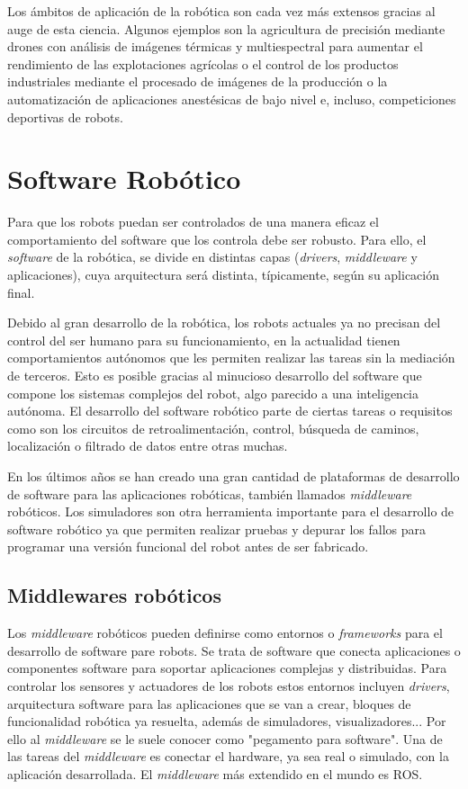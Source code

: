 Los ámbitos de aplicación de la robótica son cada vez más extensos gracias al auge de esta ciencia. Algunos ejemplos son la agricultura de precisión mediante drones con análisis de imágenes térmicas y multiespectral para aumentar el rendimiento de las explotaciones agrícolas o el control de los productos industriales mediante el procesado de imágenes de la producción o la automatización de aplicaciones anestésicas de bajo nivel e, incluso, competiciones deportivas de robots.

\section{Software Robótico}
Para que los robots puedan ser controlados de una manera eficaz el comportamiento del software que los controla debe ser robusto. Para ello, el \textit{software} de la robótica, se divide en distintas capas (\textit{drivers}, \textit{middleware} y aplicaciones), cuya arquitectura será distinta, típicamente, según su aplicación final.

Debido al gran desarrollo de la robótica, los robots actuales ya no precisan del control del ser humano para su funcionamiento, en la actualidad tienen comportamientos autónomos que les permiten realizar las tareas sin la mediación de terceros. Esto es posible gracias al minucioso desarrollo del software que compone los sistemas complejos del robot, algo parecido a una inteligencia autónoma. El desarrollo del software robótico parte de ciertas tareas o requisitos como son los circuitos de retroalimentación, control, búsqueda de caminos, localización o filtrado de datos entre otras muchas.

En los últimos años se han creado una gran cantidad de plataformas de desarrollo de software para las aplicaciones robóticas, también llamados \textit{middleware} robóticos. Los simuladores son otra herramienta importante para el desarrollo de software robótico ya que permiten realizar pruebas y depurar los fallos para programar una versión funcional del robot antes de ser fabricado. 

\subsection{Middlewares robóticos}
Los \textit{middleware} robóticos pueden definirse como entornos o \textit{frameworks} para el desarrollo de software pare robots. Se trata de software que conecta aplicaciones o componentes software para soportar aplicaciones complejas y distribuidas. Para controlar los sensores y actuadores de los robots estos entornos incluyen \textit{drivers}, arquitectura software para las aplicaciones que se van a crear, bloques de funcionalidad robótica ya resuelta, además de simuladores, visualizadores... Por ello al \textit{middleware} se le suele conocer como "pegamento para software". Una de las tareas del \textit{middleware} es conectar el hardware, ya sea real o simulado, con la aplicación desarrollada. El \textit{middleware} más extendido en el mundo es ROS.

